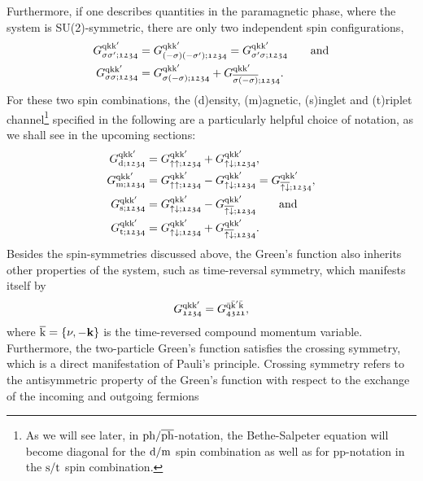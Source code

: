 \documentclass[../../main.tex]{subfiles}
\begin{document}
Furthermore, if one describes quantities in the paramagnetic phase, where the system is SU(2)-symmetric, there are only two independent spin configurations,
\begin{subequations}
\begin{align}
	G_{\sigma\sigma';\mathfrak{1234}}^{\text{q}\text{k}\text{k}'}&=G_{(-\sigma)(-\sigma');\mathfrak{1234}}^{\text{q}\text{k}\text{k}'}=G_{\sigma'\sigma;\mathfrak{1234}}^{\text{q}\text{k}\text{k}'}\qquad\text{and}\\
	G_{\sigma\sigma;\mathfrak{1234}}^{\text{q}\text{k}\text{k}'}&=G_{\sigma(-\sigma);\mathfrak{1234}}^{\text{q}\text{k}\text{k}'}+G_{\overline{\sigma(-\sigma)};\mathfrak{1234}}^{\text{q}\text{k}\text{k}'}.
\end{align}
\end{subequations}
For these two spin combinations, the (d)ensity, (m)agnetic, (s)inglet and (t)riplet channel\footnote{As we will see later, in $\text{ph}/\overline{\text{ph}}$-notation, the Bethe-Salpeter equation will become diagonal for the $\text{d}/\text{m}$ spin combination as well as for pp-notation in the $\text{s}/\text{t}$ spin combination.} specified in the following are a particularly helpful choice of notation, as we shall see in the upcoming sections: 
\begin{subequations}
\begin{align}
	G_{\text{d};\mathfrak{1234}}^{\text{q}\text{k}\text{k}'}&=G_{\uparrow\uparrow;\mathfrak{1234}}^{\text{q}\text{k}\text{k}'}+G_{\uparrow\downarrow;\mathfrak{1234}}^{\text{q}\text{k}\text{k}'},\label{eq:two_particle_green_density}\\
	G_{\text{m};\mathfrak{1234}}^{\text{q}\text{k}\text{k}'}&=G_{\uparrow\uparrow;\mathfrak{1234}}^{\text{q}\text{k}\text{k}'}-G_{\uparrow\downarrow;\mathfrak{1234}}^{\text{q}\text{k}\text{k}'}=G_{\overline{\uparrow\downarrow};\mathfrak{1234}}^{\text{q}\text{k}\text{k}'},\label{eq:two_particle_green_magnetic}\\
	G_{\text{s};\mathfrak{1234}}^{\text{q}\text{k}\text{k}'}&=G^{\text{q}\text{k}\text{k}'}_{\uparrow\downarrow;\mathfrak{1234}}-G^{\text{q}\text{k}\text{k}'}_{\overline{\uparrow\downarrow};\mathfrak{1234}}\qquad\text{and}\\
	G_{\text{t};\mathfrak{1234}}^{\text{q}\text{k}\text{k}'}&=G^{\text{q}\text{k}\text{k}'}_{\uparrow\downarrow;\mathfrak{1234}}+G^{\text{q}\text{k}\text{k}'}_{\overline{\uparrow\downarrow};\mathfrak{1234}}.
\end{align}
\end{subequations}
Besides the spin-symmetries discussed above, the Green's function also inherits other properties of the system, such as time-reversal symmetry, which manifests itself by
\begin{align}
	G_{\mathfrak{1234}}^{\text{q}\text{k}\text{k}'}=G_{\mathfrak{4321}}^{\bar{\text{q}}\bar{\text{k}}'\bar{\text{k}}},
\end{align} 
where $\overline{\text{k}}=\{\nu,-\textbf{k}\}$ is the time-reversed compound momentum variable. Furthermore, the two-particle Green's function satisfies the crossing symmetry, which is a direct manifestation of Pauli's principle. Crossing symmetry refers to the antisymmetric property of the Green's function with respect to the exchange of the incoming and outgoing fermions
\end{document}

